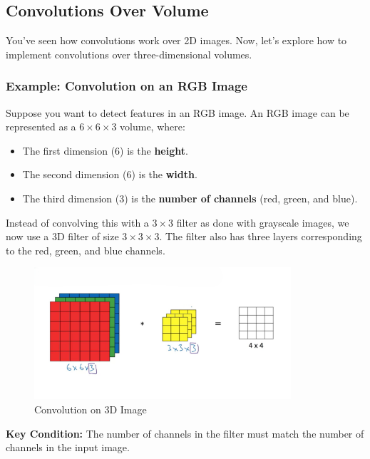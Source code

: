 \documentclass[letterpaper,12pt,notitlepage,twoside]{report}
\begin{document}
\subsection{Convolutions Over Volume}
You've seen how convolutions work over 2D images. Now, let's explore how to implement convolutions over three-dimensional volumes. 

\subsubsection*{Example: Convolution on an RGB Image}

Suppose you want to detect features in an RGB image. An RGB image can be represented as a $6 \times 6 \times 3$ volume, where:
\begin{itemize}[nosep]
    \item The first dimension ($6$) is the \textbf{height}.
    \item The second dimension ($6$) is the \textbf{width}.
    \item The third dimension ($3$) is the \textbf{number of channels} (red, green, and blue).
\end{itemize}

Instead of convolving this with a $3 \times 3$ filter as done with grayscale images, we now use a 3D filter of size $3 \times 3 \times 3$. The filter also has three layers corresponding to the red, green, and blue channels. 

\begin{figure}[h]
	\centering
	\includegraphics[width=0.85\textwidth]{Images/Convolution on 3D Image.png}
	\caption{Convolution on 3D Image}
	\label{fig:24}
\end{figure}
\FloatBarrier

\textbf{Key Condition:} The number of channels in the filter must match the number of channels in the input image.
\end{document}
